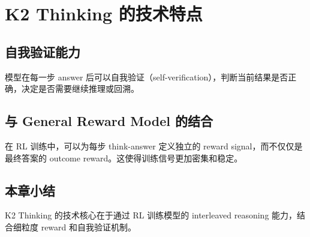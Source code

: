 \section{K2 Thinking 的技术特点}

\subsection{自我验证能力}

模型在每一步 answer 后可以自我验证（self-verification），判断当前结果是否正确，决定是否需要继续推理或回溯。

\subsection{与 General Reward Model 的结合}

在 RL 训练中，可以为每步 think-answer 定义独立的 reward signal，而不仅仅是最终答案的 outcome reward。这使得训练信号更加密集和稳定。

\subsection{本章小结}

K2 Thinking 的技术核心在于通过 RL 训练模型的 interleaved reasoning 能力，结合细粒度 reward 和自我验证机制。

